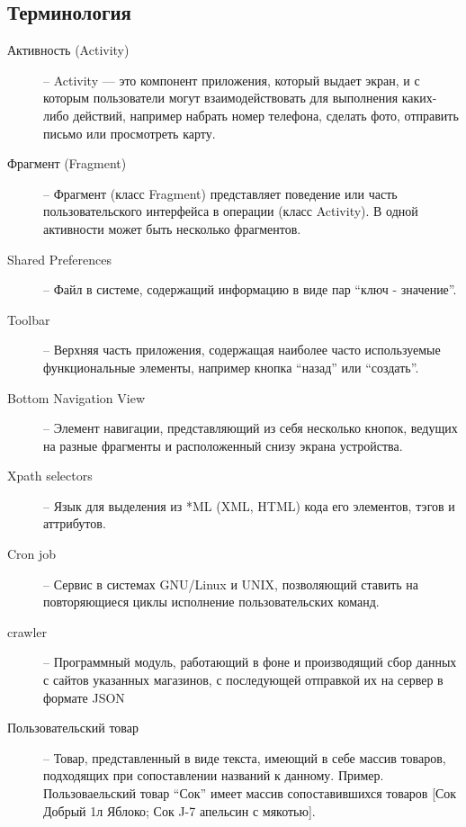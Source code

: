 \subsection{Терминология}
\begin{description}
    \item[Активность (Activity)] --
        Activity — это компонент приложения, который выдает экран, и с которым
        пользователи могут взаимодействовать для выполнения каких-либо
        действий, например набрать номер телефона, сделать фото, отправить
        письмо или просмотреть карту. 

    \item[Фрагмент (Fragment)] -- 
        Фрагмент (класс Fragment) представляет поведение или часть
        пользовательского интерфейса в операции (класс Activity). В одной
        активности может быть несколько фрагментов.

    \item[Shared Preferences] -- 
        Файл в системе, содержащий информацию в виде пар ``ключ - значение''.

    \item[Toolbar] --
        Верхняя часть приложения, содержащая наиболее часто используемые
        функциональные элементы, например кнопка ``назад'' или ``создать''.

    \item[Bottom Navigation View] -- 
        Элемент навигации, представляющий из себя несколько кнопок, ведущих на
        разные фрагменты и расположенный снизу экрана устройства.

    \item[Xpath selectors] -- 
        Язык для выделения из *ML (XML, HTML) кода его элементов, тэгов и аттрибутов.

    \item[Cron job] -- 
        Сервис в системах GNU/Linux и UNIX, позволяющий ставить на
        повторяющиеся циклы исполнение пользовательских команд.

    \item[crawler] --
            Программный модуль, работающий в фоне и производящий сбор данных с сайтов
            указанных магазинов, с последующей отправкой их на сервер в формате
            JSON

    \item[Пользовательский товар] --
            Товар, представленный в виде текста, имеющий в себе массив товаров,
            подходящих при сопоставлении названий к данному. Пример.
            Пользоваельский товар ``Сок'' имеет массив сопоставившихся товаров [Сок
            Добрый 1л Яблоко; Сок J-7 апельсин с мякотью].


\end{description}
